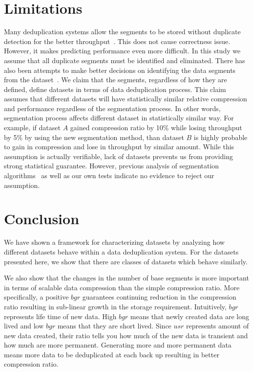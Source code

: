 \section{Limitations}\label{lim}
Many deduplication systems allow the segments to be stored without duplicate detection for the better throughput~\cite{bhagwat:2009, lillibridge:2009}. This does not cause correctness issue. However, it makes predicting performance even more difficult. In this study we assume that all duplicate segments must be identified and eliminated. There has also been attempts to make better decisions on identifying the data segments from the dataset~\cite{eshghi:2005, kruus:2010, bobbarjung:2006}. We claim that the segments, regardless of how they are defined, define datasets in terms of data deduplication process. This claim assumes that different datasets will have statistically similar relative compression and performance regardless of the segmentation process. In other words, segmentation process affects different dataset in statistically similar way. For example, if dataset $A$ gained compression ratio by 10\% while losing throughput by 5\% by using the new segmentation method, than dataset $B$ is highly probable to gain in compression and lose in throughput by similar amount. While this assumption is actually verifiable, lack of datasets prevents us from providing strong statistical guarantee. However, previous analysis of segmentation algorithms~\cite{kruus:2010} as well as our own tests indicate no evidence to reject our assumption.

\section{Conclusion}\label{con}
We have shown a framework for characterizing datasets by analyzing how different datasets behave within a data deduplication system. For the datasets presented here, we show that there are classes of datasets which behave similarly.

We also show that the changes in the number of base segments is more important in terms of scalable data compression than the simple compression ratio. More specifically, a positive $bgr$ guarantees continuing reduction in the compression ratio resulting in sub-linear growth in the storage requirement. Intuitively, $bgr$ represents life time of new data. High $bgr$ means that newly created data are long lived and low $bgr$ means that they are short lived. Since $usr$ represents amount of new data created, their ratio tells you how much of the new data is transient and how much are more permanent. Generating more and more permanent data means more data to be deduplicated at each back up resulting in better compression ratio.  

